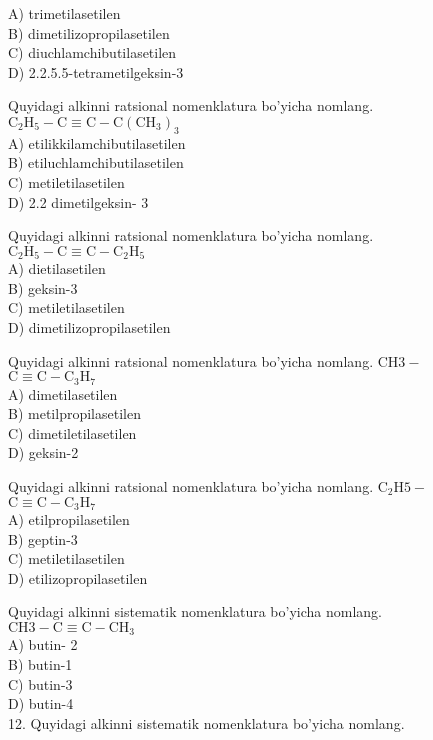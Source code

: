 A) trimetilasetilen\\
B) dimetilizopropilasetilen\\
C) diuchlamchibutilasetilen\\
D) 2.2.5.5-tetrametilgeksin-3
  \item Quyidagi alkinni ratsional nomenklatura bo'yicha nomlang.\\
$\mathrm{C}_{2} \mathrm{H}_{5}-\mathrm{C} \equiv \mathrm{C}-\mathrm{C}\left(\mathrm{CH}_{3}\right)_{3}$\\
A) etilikkilamchibutilasetilen\\
B) etiluchlamchibutilasetilen\\
C) metiletilasetilen\\
D) 2.2 dimetilgeksin- 3
  \item Quyidagi alkinni ratsional nomenklatura bo'yicha nomlang.\\
$\mathrm{C}_{2} \mathrm{H}_{5}-\mathrm{C} \equiv \mathrm{C}-\mathrm{C}_{2} \mathrm{H}_{5}$\\
A) dietilasetilen\\
B) geksin-3\\
C) metiletilasetilen\\
D) dimetilizopropilasetilen
  \item Quyidagi alkinni ratsional nomenklatura bo'yicha nomlang. $\mathrm{CH} 3-$ $\mathrm{C} \equiv \mathrm{C}-\mathrm{C}_{3} \mathrm{H}_{7}$\\
A) dimetilasetilen\\
B) metilpropilasetilen\\
C) dimetiletilasetilen\\
D) geksin-2
  \item Quyidagi alkinni ratsional nomenklatura bo'yicha nomlang. $\mathrm{C}_{2} \mathrm{H} 5-$ $\mathrm{C} \equiv \mathrm{C}-\mathrm{C}_{3} \mathrm{H}_{7}$\\
A) etilpropilasetilen\\
B) geptin-3\\
C) metiletilasetilen\\
D) etilizopropilasetilen
  \item Quyidagi alkinni sistematik nomenklatura bo'yicha nomlang.\\
$\mathrm{CH} 3-\mathrm{C} \equiv \mathrm{C}-\mathrm{CH}_{3}$\\
A) butin- 2\\
B) butin-1\\
C) butin-3\\
D) butin-4\\
12. Quyidagi alkinni sistematik nomenklatura bo'yicha nomlang.\\
